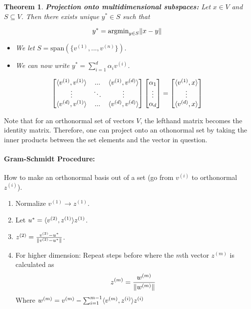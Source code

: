 \documentclass[a4paper,12pt]{report}
\DeclarePairedDelimiter\norm{\lVert}{\rVert}%
\DeclarePairedDelimiter\inpr{\langle}{\rangle}%
\newtheorem{theorem}{Theorem}
\begin{document}
\begin{theorem} \textbf{Projection onto multidimensional subspaces: } Let $x\in V$ and $S \subseteq V$. Then there exists unique $y^* \in S$ such that

\begin{equation}
y^* = \text{argmin}_{y\in S} \norm{x-y}
\end{equation}

\begin{itemize}
\item We let $S = \text{span}(\{v^{(1)}, ..., v^{(n)}\})$. 
\item We can now write $y^* = \sum_{i=1}^{d} \alpha_i v^{(i)}$.
\end{itemize}

\begin{equation}
\begin{bmatrix}
\inpr{v^{(1)}, v^{(1)}} & ... & \inpr{v^{(1)}, v^{(d)}}\\
\vdots & \ddots & \vdots \\
\inpr{v^{(d)}, v^{(1)}} & ... & \inpr{v^{(d)}, v^{(d)}}
\end{bmatrix}
\begin{bmatrix}
\alpha_1 \\
\vdots \\
\alpha_d
\end{bmatrix} = 
\begin{bmatrix}
\inpr{v^{(1)}, x} \\
\vdots \\
\inpr{v^{(d)}, x}
\end{bmatrix}
\end{equation}


\end{theorem}

Note that for an orthonormal set of vectors $V$, the lefthand matrix becomes the identity matrix. Therefore, one can project onto an othonormal set by taking the inner products between the set elements and the vector in question.

\paragraph{Gram-Schmidt Procedure: } How to make an orthonormal basis out of a set (go from $v^{(i)}$ to orthonormal $z^{(i)}$).

\begin{enumerate}
\item Normalize $v^{(1)} \to z^{(1)}$.
\item Let $u^* = \inpr{v^{(2)}, z^{(1)}}z^{(1)}$.
\item $z^{(2)} = \frac{v^{(2)} - u^*}{\norm{v^{(2)} - u^* }}$.
\item For higher dimension: Repeat steps before where the $m$th vector $z^{(m)}$ is calculated as 
$$z^{(m)} = \frac{w^{(m)}}{\norm{w^{(m)}}}$$
Where $w^{(m)} = v^{(m)} - \sum_{i=1}^{m-1} \inpr{v^{(m)} , z^{(i)}} z^{(i)}$
\end{enumerate}
\end{document}
